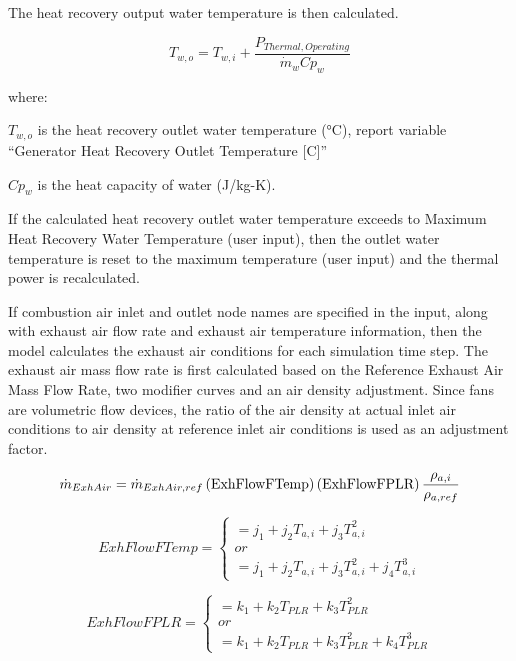 The heat recovery output water temperature is then calculated.

\begin{equation}
  T_{w,o} = T_{w,i} + \frac{P_{Thermal,Operating}}{\dot{m}_w C{p_w}}
\end{equation}

where:

\({T_{w,o}}\) is the heat recovery outlet water temperature (°C), report variable ``Generator Heat Recovery Outlet Temperature {[}C{]}''

\(C{p_w}\) is the heat capacity of water (J/kg-K).

If the calculated heat recovery outlet water temperature exceeds to Maximum Heat Recovery Water Temperature (user input), then the outlet water temperature is reset to the maximum temperature (user input) and the thermal power is recalculated.

If combustion air inlet and outlet node names are specified in the input, along with exhaust air flow rate and exhaust air temperature information, then the model calculates the exhaust air conditions for each simulation time step. The exhaust air mass flow rate is first calculated based on the Reference Exhaust Air Mass Flow Rate, two modifier curves and an air density adjustment. Since fans are volumetric flow devices, the ratio of the air density at actual inlet air conditions to air density at reference inlet air conditions is used as an adjustment factor.

\begin{equation}
  \dot{m}_{ExhAir} = \dot{m}_{ExhAir,ref} \left(\text{ExhFlowFTemp}\right) \left(\text{ExhFlowFPLR}\right) \frac{\rho_{a,i}}{\rho_{a,ref}}
\end{equation}

\begin{equation}
ExhFlowFTemp = \left\{
  \begin{array}{l}
         = j_1 + j_2 T_{a,i} + j_3 T_{a,i}^2 \\
         or \\
         = j_1 + j_2 T_{a,i} + j_3 T_{a,i}^2 + j_4 T_{a,i}^3
  \end{array}
\right.
\end{equation}

\begin{equation}
ExhFlowFPLR = \left\{
  \begin{array}{l}
          = k_1 + k_2 T_{PLR} + k_3 T_{PLR}^2 \\
          or \\
          = k_1 + k_2 T_{PLR} + k_3 T_{PLR}^2 + k_4 T_{PLR}^3
  \end{array}
\right.
\end{equation}

